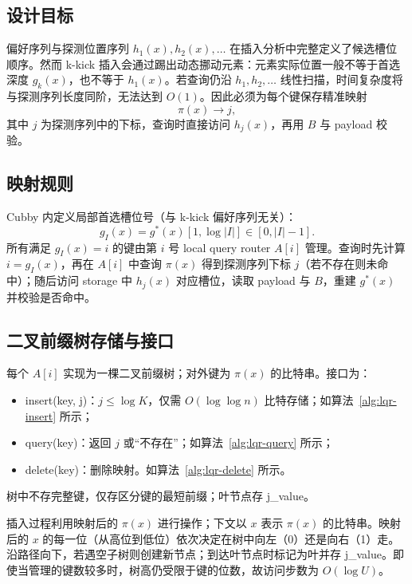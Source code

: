 \subsection{设计目标}

偏好序列与探测位置序列 \(h_1(x),h_2(x),\ldots\) 在插入分析中完整定义了候选槽位顺序。然而 k-kick 插入会通过踢出动态挪动元素：元素实际位置一般不等于首选深度 \(g_k(x)\)，也不等于 \(h_1(x)\)。若查询仍沿 \(h_1,h_2,\ldots\) 线性扫描，时间复杂度将与探测序列长度同阶，无法达到 \(O(1)\)。因此必须为每个键保存精准映射
\[
  \pi(x)\longrightarrow j,
\]
其中 \(j\) 为探测序列中的下标，查询时直接访问 \(h_j(x)\)，再用 \(B\) 与 payload 校验\cite{bender2022otsh,pagh2008retrieval}。

\subsection{映射规则}

Cubby 内定义局部首选槽位号（与 k-kick 偏好序列无关）：
\[
  g_I(x)=g^\ast(x)[1,\log|I|]\in[0,|I|-1].
\]
所有满足 \(g_I(x)=i\) 的键由第 \(i\) 号 local query router \(A[i]\) 管理。查询时先计算 \(i=g_I(x)\)，再在 \(A[i]\) 中查询 \(\pi(x)\) 得到探测序列下标 \(j\)（若不存在则未命中）；随后访问 storage 中 \(h_j(x)\) 对应槽位，读取 payload 与 \(B\)，重建 \(g^\ast(x)\) 并校验是否命中。

\subsection{二叉前缀树存储与接口}

每个 \(A[i]\) 实现为一棵二叉前缀树；对外键为 \(\pi(x)\) 的比特串。接口为：
\begin{itemize}
  \item insert(key, j)：\(j\le\log K\)，仅需 \(O(\log\log n)\) 比特存储；如算法~\ref{alg:lqr-insert} 所示；
  \item query(key)：返回 \(j\) 或“不存在”；如算法~\ref{alg:lqr-query} 所示；
  \item delete(key)：删除映射。如算法~\ref{alg:lqr-delete} 所示。
\end{itemize}

树中不存完整键，仅存区分键的最短前缀；叶节点存 j\_value。

插入过程利用映射后的 \(\pi(x)\) 进行操作；下文以 \(x\) 表示 \(\pi(x)\) 的比特串。映射后的 \(x\) 的每一位（从高位到低位）依次决定在树中向左（0）还是向右（1）走。沿路径向下，若遇空子树则创建新节点；到达叶节点时标记为叶并存 j\_value。即使当管理的键数较多时，树高仍受限于键的位数，故访问步数为 \(O(\log U)\)。

